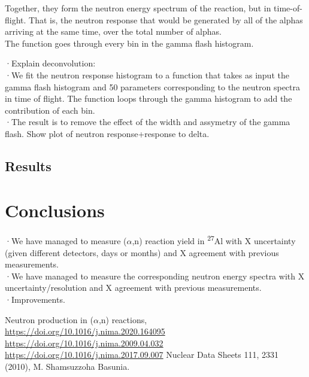 \documentclass[a4paper,12pt]{report}
\newcommand{\an}{($\alpha$,n) }
\newcommand{\Aliso}{\textsuperscript{27}Al }
\begin{document}
Together, they form the neutron energy spectrum of the reaction, but in time-of-flight.
That is, the neutron response that would be generated by all of the alphas arriving at the same time, over the total number of alphas.
\\

The function goes through every bin in the gamma flash histogram.

·Explain deconvolution:\\
·We fit the neutron response histogram to a function that takes as input the gamma flash histogram and 50 parameters corresponding to the neutron spectra in time of flight. The function loops through the gamma histogram to add the contribution of each bin.\\
·The result is to remove the effect of the width and assymetry of the gamma flash. Show plot of neutron response+response to delta.\\

\section{Results}

\chapter{Conclusions}
·We have managed to measure \an reaction yield in \Aliso with X uncertainty (given different detectors, days or months) and X agreement with previous measurements.\\
·We have managed to measure the corresponding neutron energy spectra with X uncertainty/resolution and X agreement with previous measurements.\\
·Improvements.\\

\begin{thebibliography}{5}
	Neutron production in \an reactions, \url{https://doi.org/10.1016/j.nima.2020.164095}
	\bibitem{}\url{https://doi.org/10.1016/j.nima.2009.04.032}
	\bibitem{}\url{https://doi.org/10.1016/j.nima.2017.09.007}
	Nuclear Data Sheets 111, 2331 (2010), M. Shamsuzzoha Basunia.
\end{thebibliography}
\end{document}
